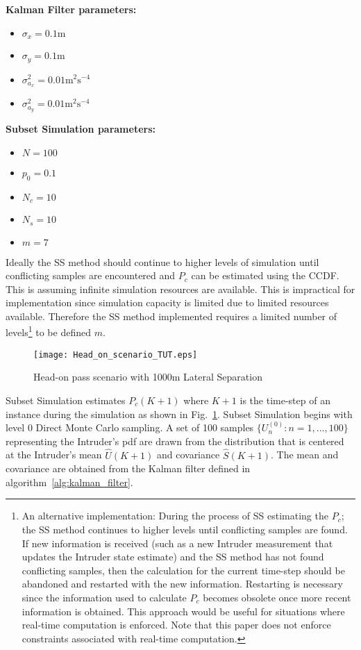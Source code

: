\documentclass[journal]{IEEEtran}
\begin{document}
\textbf{Kalman Filter parameters:}
\begin{itemize}
	\item $\sigma_{x} = 0.1\text{m}$
	\item $\sigma_{y} = 0.1\text{m}$
	\item $\sigma_{a_{x}}^{2} = 0.01\text{m}^{2}\text{s}^{-4}$
	\item $\sigma_{a_{y}}^{2} = 0.01\text{m}^{2}\text{s}^{-4}$
\end{itemize}

\textbf{Subset Simulation parameters:}
\begin{itemize}	
	\item $N = 100$
	\item $p_{0} = 0.1$
	\item $N_{c} = 10$
	\item $N_{s} = 10$
	\item $m = 7$ 
\end{itemize}

Ideally the SS method should continue to higher levels of simulation until conflicting samples are encountered and $P_{c}$ can be estimated using the CCDF. This is assuming infinite simulation resources are available. This is impractical for implementation since simulation capacity is limited due to limited resources available. Therefore the SS method implemented requires a limited number of levels\negthinspace \footnote{An alternative implementation: During the process of SS estimating the $P_{c}$; the SS method continues to higher levels until conflicting samples are found. If new information is received (such as a new Intruder measurement that updates the Intruder state estimate) and the SS method has not found conflicting samples, then the calculation for the current time-step should be abandoned and restarted with the new information. Restarting is necessary since the information used to calculate $P_{c}$ becomes obsolete once more recent information is obtained. This approach would be useful for situations where real-time computation is enforced. Note that this paper does not enforce constraints associated with real-time computation.} to be defined $m$.


\begin{figure}\centering
\texttt{[image: Head\_on\_scenario\_TUT.eps]}
\caption{Head-on pass scenario with 1000m Lateral Separation}
\label{fig:headon_TUT}
\end{figure}

Subset Simulation estimates $P_{c}(K+1)$ where $K+1$ is the time-step of an instance during the simulation as shown in Fig.~\ref{fig:headon_TUT}. Subset Simulation begins with level 0 Direct Monte Carlo sampling. A set of 100 samples $\{U_{n}^{(0)}: n = 1,...,100 \}$ representing the Intruder's pdf are drawn from the distribution that is centered at the Intruder's mean $\hat{U}(K+1)$ and covariance $\hat{S}(K+1)$. The mean and covariance are obtained from the Kalman filter defined in algorithm~\ref{alg:kalman_filter}.
\end{document}
